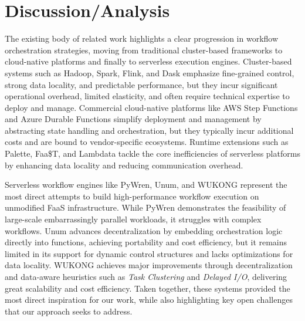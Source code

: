 \section{Discussion/Analysis}
The existing body of related work highlights a clear progression in workflow orchestration strategies, moving from traditional cluster-based frameworks to cloud-native platforms and finally to serverless execution engines. Cluster-based systems such as Hadoop, Spark, Flink, and Dask emphasize fine-grained control, strong data locality, and predictable performance, but they incur significant operational overhead, limited elasticity, and often require technical expertise to deploy and manage. Commercial cloud-native platforms like AWS Step Functions and Azure Durable Functions simplify deployment and management by abstracting state handling and orchestration, but they typically incur additional costs and are bound to vendor-specific ecosystems. Runtime extensions such as Palette, Faa\$T, and Lambdata tackle the core inefficiencies of serverless platforms by enhancing data locality and reducing communication overhead.

Serverless workflow engines like PyWren, Unum, and WUKONG represent the most direct attempts to build high-performance workflow execution on unmodified FaaS infrastructure. While PyWren demonstrates the feasibility of large-scale embarrassingly parallel workloads, it struggles with complex workflows. Unum advances decentralization by embedding orchestration logic directly into functions, achieving portability and cost efficiency, but it remains limited in its support for dynamic control structures and lacks optimizations for data locality. WUKONG achieves major improvements through decentralization and data-aware heuristics such as \textit{Task Clustering} and \textit{Delayed I/O}, delivering great scalability and cost efficiency. Taken together, these systems provided the most direct inspiration for our work, while also highlighting key open challenges that our approach seeks to address.